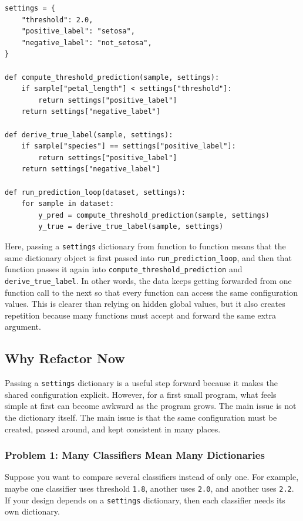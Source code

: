\begin{verbatim}
settings = {
    "threshold": 2.0,
    "positive_label": "setosa",
    "negative_label": "not_setosa",
}

def compute_threshold_prediction(sample, settings):
    if sample["petal_length"] < settings["threshold"]:
        return settings["positive_label"]
    return settings["negative_label"]

def derive_true_label(sample, settings):
    if sample["species"] == settings["positive_label"]:
        return settings["positive_label"]
    return settings["negative_label"]

def run_prediction_loop(dataset, settings):
    for sample in dataset:
        y_pred = compute_threshold_prediction(sample, settings)
        y_true = derive_true_label(sample, settings)
\end{verbatim}

\noindent
Here, passing a \texttt{settings} dictionary from function to function means that the same dictionary object is first passed into \texttt{run\_prediction\_loop}, and then that function passes it again into \texttt{compute\_threshold\_prediction} and \texttt{derive\_true\_label}.
In other words, the data keeps getting forwarded from one function call to the next so that every function can access the same configuration values.
This is clearer than relying on hidden global values, but it also creates repetition because many functions must accept and forward the same extra argument.

\subsection{Why Refactor Now}
Passing a \texttt{settings} dictionary is a useful step forward because it makes the shared configuration explicit.
However, for a first small program, what feels simple at first can become awkward as the program grows.
The main issue is not the dictionary itself.
The main issue is that the same configuration must be created, passed around, and kept consistent in many places.

\subsubsection{Problem 1: Many Classifiers Mean Many Dictionaries}
Suppose you want to compare several classifiers instead of only one.
For example, maybe one classifier uses threshold \texttt{1.8}, another uses \texttt{2.0}, and another uses \texttt{2.2}.
If your design depends on a \texttt{settings} dictionary, then each classifier needs its own dictionary.

